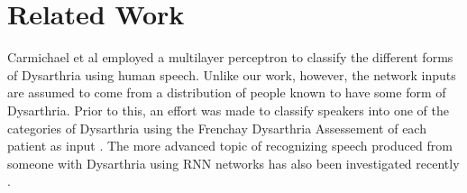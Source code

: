 \section{Related Work}
Carmichael et al \cite{carmichael2008combining} employed a multilayer perceptron to classify the different forms of Dysarthria using human speech. Unlike our work, however, the network inputs are assumed to come from a distribution of people known to have some form of Dysarthria. Prior to this, an effort was made to classify speakers into one of the categories of Dysarthria using the Frenchay Dysarthria Assessement of each patient as input \cite{enderby1980frenchay} \cite{carmichael2007introducing}. The more advanced topic of recognizing speech produced from someone with Dysarthria using RNN networks has also been investigated recently \cite{dys-speech-rec-1} \cite{dys-speech-rec-2}. 